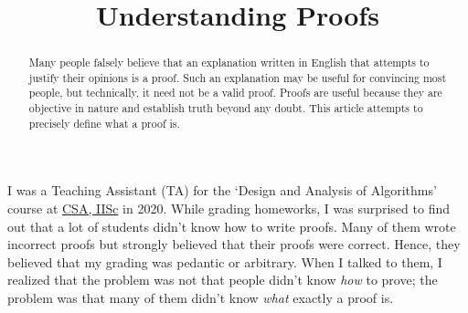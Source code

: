 
\usepackage[shortlabels]{enumitem}
\usepackage{setspace}

\onehalfspacing

\DeclareMathOperator{\isOdd}{isOdd}
\newcommand*{\todotext}[1]{\textcolor{textRed}{#1}}
\newenvironment*{tightemize}{\begin{itemize}[noitemsep,topsep=0pt]}{\end{itemize}}

\renewcommand{\algorithmiccomment}[1]{\hfill\textcolor{gray}{\texttt{//} \textit{#1}}}
\newsavebox{\formalproofbox}
\newenvironment*{formalproof}%
{\begin{lrbox}{\formalproofbox}\begin{minipage}{0.9\textwidth}\phantomsection\algorithmic[1]}%
{\endalgorithmic\end{minipage}\end{lrbox}\vspace{\parskip}\noindent
\colorbox{textColor!7!bgColor}{\usebox{\formalproofbox}}\vspace{\parskip}}

\title{Understanding Proofs}



\maketitle
\setlength{\parskip}{0.4em}

\begin{abstract}
Many people falsely believe that an explanation written in English
that attempts to justify their opinions is a proof.
Such an explanation may be useful for convincing most people,
but technically, it need not be a valid proof.
Proofs are useful because they are objective in nature
and establish truth beyond any doubt.
This article attempts to precisely define what a proof is.
\end{abstract}

I was a Teaching Assistant (TA) for the `Design and Analysis of Algorithms' course
at \href{https://www.csa.iisc.ac.in/}{CSA, IISc} in 2020.
While grading homeworks, I was surprised to find out that
a lot of students didn't know how to write proofs.
Many of them wrote incorrect proofs but strongly believed that their proofs were correct.
Hence, they believed that my grading was pedantic or arbitrary.
When I talked to them, I realized that the problem was
not that people didn't know \emph{how} to prove;
the problem was that many of them didn't know \emph{what} exactly a proof is.

